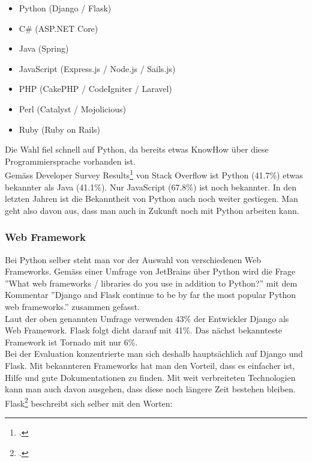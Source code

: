 
\begin{itemize}
	\item Python (Django / Flask)
	\item C\# (ASP.NET Core)
	\item Java (Spring)
	\item JavaScript (Express.js / Node.js / Sails.js)
	\item PHP (CakePHP / CodeIgniter / Laravel)
	\item Perl (Catalyst / Mojolicious)
	\item Ruby (Ruby on Rails)
\end{itemize}


Die Wahl fiel schnell auf Python, da bereits etwas KnowHow über diese Programmiersprache vorhanden ist. \\
Gemäss Developer Survey Results\footcite{developer_survey_results} von Stack Overflow ist Python (41.7\%) etwas bekannter als Java (41.1\%). Nur JavaScript (67.8\%) ist noch bekannter. In den letzten Jahren ist die Bekanntheit von Python auch noch weiter gestiegen. Man geht also davon aus, dass man auch in Zukunft noch mit Python arbeiten kann.


\subsubsection*{Web Framework}
Bei Python selber steht man vor der Auswahl von verschiedenen Web Frameworks. Gemäss einer Umfrage von JetBrains über Python wird die Frage ''What web frameworks / libraries do you use in addition to Python?'' mit dem Kommentar ''Django and Flask continue to be by far the most popular Python web frameworks.'' zusammen gefasst. \\
Laut der oben genannten Umfrage verwenden 43\% der Entwickler  Django als Web Framework. Flask folgt dicht darauf mit 41\%. Das nächst bekannteste Framework ist Tornado mit nur 6\%. \\
Bei der Evaluation konzentrierte man sich deshalb hauptsächlich auf Django und Flask. Mit bekannteren Frameworks hat man den Vorteil, dass es einfacher ist, Hilfe und gute Dokumentationen zu finden. Mit weit verbreiteten Technologien kann man auch davon ausgehen, dass diese noch längere Zeit bestehen bleiben.  \\ 

Flask\footcite{flask:foreword} beschreibt sich selber mit den Worten:

